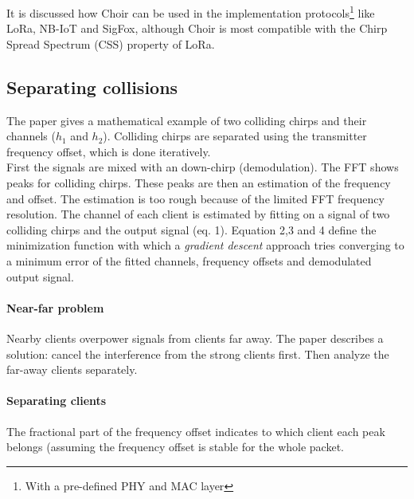 \documentclass[a4paper,journal]{IEEEtran_custom}
\begin{document}
It is discussed how Choir can be used in the implementation protocols\footnote{With a pre-defined PHY and MAC layer} like LoRa, NB-IoT and SigFox, although Choir is most compatible with the Chirp Spread Spectrum (CSS) property of LoRa. 

\subsection{Separating collisions}
\label{sec:sep_coll}
The paper gives a mathematical example of two colliding chirps and their channels ($h_1$ and $h_2$). Colliding chirps are separated using the transmitter frequency offset, which is done iteratively. \\
First the signals are mixed with an down-chirp (demodulation). The FFT shows peaks for colliding chirps. These peaks are then an estimation of the frequency and offset. The estimation is too rough because of the limited FFT frequency resolution. The channel of each client is estimated by fitting on a signal of two colliding chirps and the output signal (eq. 1). Equation 2,3 and 4 define the minimization function with which a \emph{gradient descent} approach tries converging to a minimum error of the fitted channels, frequency offsets and demodulated output signal.

\paragraph{Near-far problem} Nearby clients overpower signals from clients far away. The paper describes a solution: cancel the interference from the strong clients first. Then analyze the far-away clients separately.
\paragraph{Separating clients} The fractional part of the frequency offset indicates to which client each peak belongs (assuming the frequency offset is stable for the whole packet.
\end{document}
